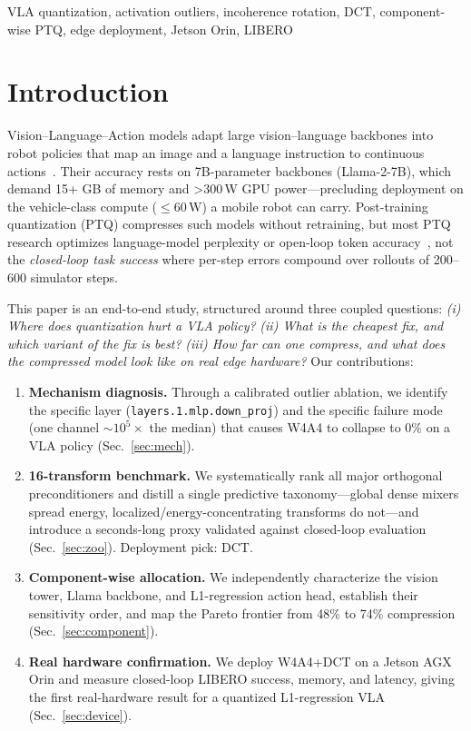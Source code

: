 \documentclass[conference]{IEEEtran}
\begin{document}
\begin{IEEEkeywords}
VLA quantization, activation outliers, incoherence rotation, DCT, component-wise PTQ,
edge deployment, Jetson Orin, LIBERO
\end{IEEEkeywords}

\section{Introduction}
\label{sec:intro}

Vision--Language--Action models adapt large vision--language backbones into robot policies
that map an image and a language instruction to continuous actions~\cite{openvla,openvlaoft}.
Their accuracy rests on 7B-parameter backbones (Llama-2-7B), which demand 15+ GB of memory
and >300\,W GPU power---precluding deployment on the vehicle-class compute ($\leq$60\,W) a
mobile robot can carry. Post-training quantization (PTQ) compresses such models without
retraining, but most PTQ research optimizes language-model perplexity or open-loop token
accuracy~\cite{gptq,awq,smoothquant,quarot,spinquant}, not the \emph{closed-loop task success}
where per-step errors compound over rollouts of 200--600 simulator steps.

This paper is an end-to-end study, structured around three coupled questions:
\emph{(i) Where does quantization hurt a VLA policy?}
\emph{(ii) What is the cheapest fix, and which variant of the fix is best?}
\emph{(iii) How far can one compress, and what does the compressed model look like on real
edge hardware?} Our contributions:

\begin{enumerate}
  \item \textbf{Mechanism diagnosis.} Through a calibrated outlier ablation, we identify
        the specific layer (\texttt{layers.1.mlp.down\_proj}) and the specific failure mode
        (one channel $\sim\!10^5\times$ the median) that causes W4A4 to collapse to 0\%
        on a VLA policy (Sec.~\ref{sec:mech}).
  \item \textbf{16-transform benchmark.} We systematically rank all major orthogonal
        preconditioners and distill a single predictive taxonomy---global dense mixers spread
        energy, localized/energy-concentrating transforms do not---and introduce a
        seconds-long proxy validated against closed-loop evaluation (Sec.~\ref{sec:zoo}).
        Deployment pick: DCT.
  \item \textbf{Component-wise allocation.} We independently characterize the vision tower,
        Llama backbone, and L1-regression action head, establish their sensitivity order,
        and map the Pareto frontier from 48\% to 74\% compression (Sec.~\ref{sec:component}).
  \item \textbf{Real hardware confirmation.} We deploy W4A4+DCT on a Jetson AGX Orin and
        measure closed-loop LIBERO success, memory, and latency, giving the first
        real-hardware result for a quantized L1-regression VLA (Sec.~\ref{sec:device}).
\end{enumerate}
\end{document}
